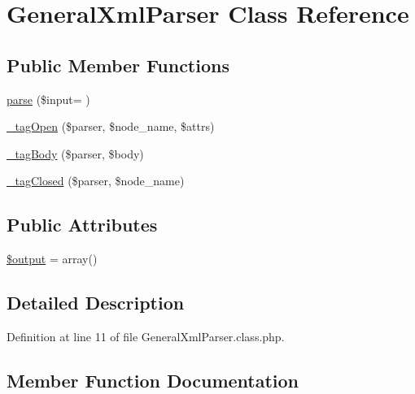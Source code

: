 \hypertarget{classGeneralXmlParser}{}\section{General\+Xml\+Parser Class Reference}
\label{classGeneralXmlParser}
\subsection*{Public Member Functions}
\begin{DoxyCompactItemize}
\item 
\hyperlink{classGeneralXmlParser_a908eec0715e2c7470a18e149a092f300}{parse} (\$input= \textquotesingle{}\textquotesingle{})
\item 
\hyperlink{classGeneralXmlParser_a2921aab91afa276ce9f6c75cf483e80d}{\+\_\+tag\+Open} (\$parser, \$node\+\_\+name, \$attrs)
\item 
\hyperlink{classGeneralXmlParser_a78c57730ac9d216ba88c02eb2f3c2903}{\+\_\+tag\+Body} (\$parser, \$body)
\item 
\hyperlink{classGeneralXmlParser_a4609e66c695acd3f1a85450228f0b79b}{\+\_\+tag\+Closed} (\$parser, \$node\+\_\+name)
\end{DoxyCompactItemize}
\subsection*{Public Attributes}
\begin{DoxyCompactItemize}
\item 
\hyperlink{classGeneralXmlParser_a33ef1b950659188b06d8586c366f8fe2}{\$output} = array()
\end{DoxyCompactItemize}


\subsection{Detailed Description}


Definition at line 11 of file General\+Xml\+Parser.\+class.\+php.



\subsection{Member Function Documentation}
